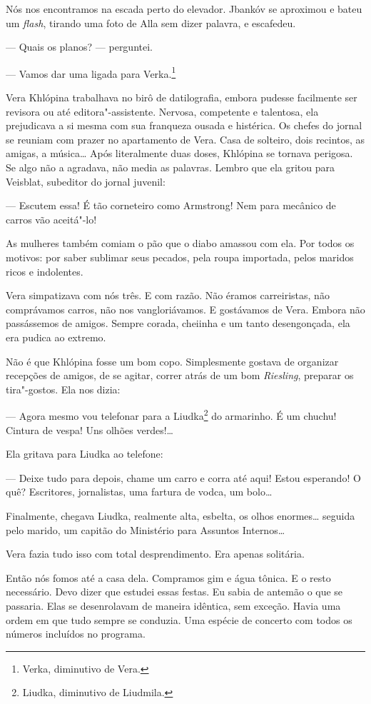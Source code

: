 Nós nos encontramos na escada perto do elevador. Jbankóv se aproximou e
bateu um \emph{flash}, tirando uma foto de Alla sem dizer palavra, e
escafedeu.

--- Quais os planos? --- perguntei.

--- Vamos dar uma ligada para Verka.\footnote{Verka, diminutivo de Vera.}

Vera Khlópina trabalhava no birô de datilografia, embora pudesse
facilmente ser revisora ou até editora"-assistente. Nervosa, competente e
talentosa, ela prejudicava a si mesma com sua franqueza ousada e
histérica. Os chefes do jornal se reuniam com prazer no apartamento de
Vera. Casa de solteiro, dois recintos, as amigas, a música\ldots{} Após
literalmente duas doses, Khlópina se tornava perigosa. Se algo não a
agradava, não media as palavras. Lembro que ela gritou para Veisblat,
subeditor do jornal juvenil:

--- Escutem essa! É tão corneteiro como Armstrong! Nem para mecânico de
carros vão aceitá"-lo!

As mulheres também comiam o pão que o diabo amassou com ela. Por todos
os motivos: por saber sublimar seus pecados, pela roupa importada, pelos
maridos ricos e indolentes.

Vera simpatizava com nós três. E com razão. Não éramos carreiristas, não
comprávamos carros, não nos vangloriávamos. E gostávamos de Vera. Embora
não passássemos de amigos. Sempre corada, cheiinha e um tanto
desengonçada, ela era pudica ao extremo.

Não é que Khlópina fosse um bom copo. Simplesmente gostava de organizar
recepções de amigos, de se agitar, correr atrás de um bom
\emph{Riesling}, preparar os tira"-gostos. Ela nos dizia:

--- Agora mesmo vou telefonar para a Liudka\footnote{Liudka, diminutivo de Liudmila.} do armarinho. É um chuchu!
Cintura de vespa! Uns olhões verdes!\ldots{}

Ela gritava para Liudka ao telefone:

--- Deixe tudo para depois, chame um carro e corra até aqui! Estou
esperando! O quê? Escritores, jornalistas, uma fartura de vodca, um
bolo\ldots{}

Finalmente, chegava Liudka, realmente alta, esbelta, os olhos enormes\ldots{}
seguida pelo marido, um capitão do Ministério para Assuntos Internos\ldots{}

Vera fazia tudo isso com total desprendimento. Era apenas solitária.

Então nós fomos até a casa dela. Compramos gim e água tônica. E o resto
necessário. Devo dizer que estudei essas festas. Eu sabia de antemão o
que se passaria. Elas se desenrolavam de maneira idêntica, sem exceção.
Havia uma ordem em que tudo sempre se conduzia. Uma espécie de concerto
com todos os números incluídos no programa.

